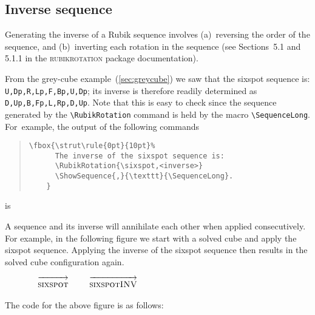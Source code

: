 \documentclass[a4paper]{article}
\begin{document}
\pagebreak

\subsection{Inverse sequence}


Generating the inverse of a Rubik sequence involves (a)~reversing the 
order of the sequence, and (b)~inverting each rotation in the sequence 
(see Sections~5.1 and 5.1.1 in the \textsc{rubikrotation} package 
documentation).

From  the grey-cube example~(\ref{sec:greycube}) we saw that the sixspot 
sequence  is: \verb!U,Dp,R,Lp,F,Bp,U,Dp!; its inverse is therefore 
readily determined as \verb!D,Up,B,Fp,L,Rp,D,Up!. Note that this is 
easy to check since the sequence generated by the  \verb!\RubikRotation! 
command is held by the macro \verb!\SequenceLong!. For~example, the 
output of the following commands
\begin{quote}
\begin{verbatim}
\fbox{\strut\rule{0pt}{10pt}%
      The inverse of the sixspot sequence is:
      \RubikRotation{\sixspot,<inverse>}
      \ShowSequence{,}{\texttt}{\SequenceLong}.
    }
\end{verbatim}
\end{quote}
is \quad{}

\bigskip

A sequence and its inverse will annihilate each other when applied 
consecutively.  For example, in the following figure we start with 
a solved cube and apply the sixspot sequence. Applying the  inverse 
of the sixspot sequence then results in the solved cube configuration
 again.

\newcommand{\sixspotarrow}{$\quad\overrightarrow{\strut\textsc{sixspot}}\quad$}
\newcommand{\sixspotINVarrow}{$\quad\overrightarrow{\strut\textsc{sixspotINV}}\quad$}

\begin{figure}[hbt]
\centering
\RubikCubeSolvedWY%
\RubikRotation{\sixspot}%
   \sixspotarrow%
%  
   \sixspotINVarrow%
\end{figure}

{\noindent}The code for the above figure is as follows:
\end{document}
